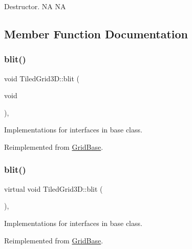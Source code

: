 Destructor.  NA  NA 

\subsection{Member Function Documentation}
\mbox{\label{classTiledGrid3D_a0c3897a09f8eba5111ec263accdc4ce6}} 
\subsubsection{\texorpdfstring{blit()}{blit()}\hspace{0.1cm}{\footnotesize\ttfamily [1/2]}}
{\footnotesize\ttfamily void Tiled\+Grid3\+D\+::blit (\begin{DoxyParamCaption}\item[{void}]{ }\end{DoxyParamCaption})\hspace{0.3cm}{\ttfamily [override]}, {\ttfamily [virtual]}}

Implementations for interfaces in base class. 

Reimplemented from \hyperlink{classGridBase_af0d708ad2c3be26a6b74e27ec732b543}{Grid\+Base}.

\mbox{\label{classTiledGrid3D_af7e3ffa4032b6aba3f5e177cd0c24459}} 
\subsubsection{\texorpdfstring{blit()}{blit()}\hspace{0.1cm}{\footnotesize\ttfamily [2/2]}}
{\footnotesize\ttfamily virtual void Tiled\+Grid3\+D\+::blit (\begin{DoxyParamCaption}{ }\end{DoxyParamCaption})\hspace{0.3cm}{\ttfamily [override]}, {\ttfamily [virtual]}}

Implementations for interfaces in base class. 

Reimplemented from \hyperlink{classGridBase_af0d708ad2c3be26a6b74e27ec732b543}{Grid\+Base}.

\mbox{\label{classTiledGrid3D_a852fcee20d027566f129e9707b7f4a62}} 

